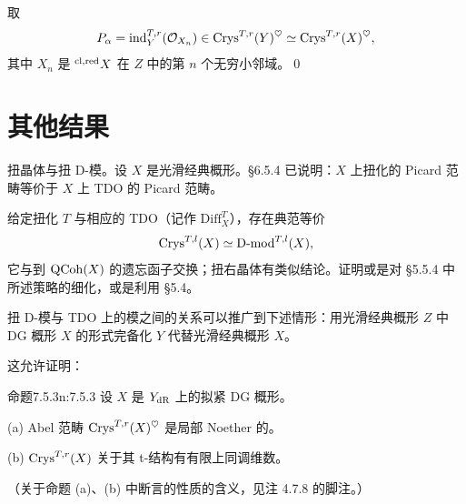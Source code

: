 取
\[
P_\alpha=\mathrm{ind}^{T,r}_Y(\mathcal{O}_{X_n})\in\mathrm{Crys}^{T,r}(Y)^\heartsuit\simeq\mathrm{Crys}^{T,r}(X)^\heartsuit,
\]
其中 $X_n$ 是 $^{\mathrm{cl,red}} X$ 在 $Z$ 中的第 $n$ 个无穷小邻域。\qed

\section{其他结果}

扭晶体与扭 D-模。设 $X$ 是光滑经典概形。§6.5.4 已说明：$X$ 上扭化的 Picard 范畴等价于 $X$ 上 TDO 的 Picard 范畴。

给定扭化 $T$ 与相应的 TDO（记作 $\mathrm{Diff}^T_X$），存在典范等价
\[
\mathrm{Crys}^{T,l}(X)\simeq\mathrm{D}\text{-}\mathrm{mod}^{T,l}(X),
\]
它与到 $\mathrm{QCoh}(X)$ 的遗忘函子交换；扭右晶体有类似结论。证明或是对 §5.5.4 中所述策略的细化，或是利用 §5.4。

扭 D-模与 TDO 上的模之间的关系可以推广到下述情形：用光滑经典概形 $Z$ 中 DG 概形 $X$ 的形式完备化 $Y$ 代替光滑经典概形 $X$。

这允许证明：

\begin{othm}{命题}{7.5.3}{n:7.5.3}
设 $X$ 是 $Y_{\mathrm{dR}}$ 上的拟紧 DG 概形。

(a) Abel 范畴 $\mathrm{Crys}^{T,r}(X)^\heartsuit$ 是局部 Noether 的。

(b) $\mathrm{Crys}^{T,r}(X)$ 关于其 t-结构有有限上同调维数。
\end{othm}

（关于命题 (a)、(b) 中断言的性质的含义，见注 4.7.8 的脚注。）
